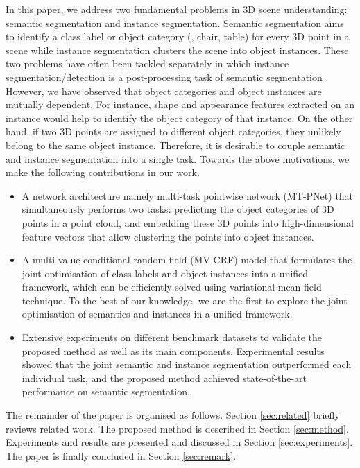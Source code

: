 \documentclass[10pt,twocolumn,letterpaper]{article}
\begin{document}
In this paper, we address two fundamental problems in 3D scene understanding:
semantic segmentation and instance segmentation. Semantic segmentation aims to
identify a class label or object category (\eg, chair, table) for every 3D point
in a scene while instance segmentation clusters the scene into object
instances. These two problems have often been tackled separately in which
instance segmentation/detection is a post-processing task of semantic
segmentation \cite{qi-frustum-cvpr18,pham-rpss-wacv19}. However, we have
observed that object categories and object instances are mutually dependent. For
instance, shape and appearance features extracted on an instance would help to
identify the object category of that instance. On the other hand, if two 3D
points are assigned to different object categories, they unlikely belong to the
same object instance. Therefore, it is desirable to couple semantic and instance
segmentation into a single task. Towards the above motivations, we make the
following contributions in our work.
\begin{itemize}
\item A network architecture namely multi-task pointwise network (MT-PNet) that
  simultaneously performs two tasks: predicting the object categories of 3D
  points in a point cloud, and embedding these 3D points into high-dimensional
  feature vectors that allow clustering the points into object instances.
\item A multi-value conditional random field (MV-CRF) model that formulates the
  joint optimisation of class labels and object instances into a unified
  framework, which can be efficiently solved using variational mean field
  technique. To the best of our knowledge, we are the first to explore the joint
  optimisation of semantics and instances in a unified framework.
\item Extensive experiments on different benchmark datasets to validate the
  proposed method as well as its main components. Experimental results showed
  that the joint semantic and instance segmentation outperformed each individual
  task, and the proposed method achieved state-of-the-art performance on
  semantic segmentation.
\end{itemize}

The remainder of the paper is organised as follows. Section \ref{sec:related}
briefly reviews related work. The proposed method is described in Section
\ref{sec:method}. Experiments and results are presented and discussed in Section
\ref{sec:experiments}. The paper is finally concluded in Section
\ref{sec:remark}.
\end{document}
